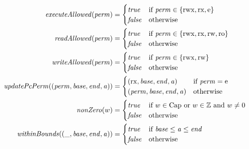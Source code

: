 \documentclass{article}
\newcommand{\false}{\mathit{false}}
\newcommand{\true}{\mathit{true}}
\newcommand{\var}[1]{\mathit{#1}}
\newcommand{\addr}{\var{a}}
\newcommand{\start}{\var{base}}
\newcommand{\addrend}{\var{end}}
\newcommand{\perm}{\var{perm}}
\newcommand{\plainfun}[2]{
  \ifthenelse{\equal{#2}{}}
             {\mathit{#1}}
             {\mathit{#1}(#2)}
}
\newcommand{\updatePcPerm}[1]{\plainfun{updatePcPerm}{#1}}
\newcommand{\executeAllowed}[1]{\plainfun{executeAllowed}{#1}}
\newcommand{\nonZero}[1]{\plainfun{nonZero}{#1}}
\newcommand{\readAllowed}[1]{\plainfun{readAllowed}{#1}}
\newcommand{\writeAllowed}[1]{\plainfun{writeAllowed}{#1}}
\newcommand{\withinBounds}[1]{\plainfun{withinBounds}{#1}}
\newcommand{\plaindom}[1]{\mathrm{#1}}
\newcommand{\Caps}{\plaindom{Cap}}
\newcommand{\ints}{\mathbb{Z}}
\newcommand{\plainperm}[1]{\mathrm{#1}}
\newcommand{\readonly}{\plainperm{ro}}
\newcommand{\readwrite}{\plainperm{rw}}
\newcommand{\exec}{\plainperm{rx}}
\newcommand{\entry}{\plainperm{e}}
\newcommand{\rwx}{\plainperm{rwx}}
\begin{document}
\begin{align*}
  \executeAllowed{\perm} &=
                           \begin{cases}
                             \true & \text{if } \perm \in \{ \rwx, \exec, \entry \} \\
                             \false & \text{otherwise}
                           \end{cases} \\
  \readAllowed{\perm} &=
                           \begin{cases}
                             \true & \text{if } \perm \in \{ \rwx, \exec, \readwrite, \readonly \} \\
                             \false & \text{otherwise}
                           \end{cases} \\
  \writeAllowed{\perm} &=
                           \begin{cases}
                             \true & \text{if } \perm \in \{ \rwx, \readwrite\} \\
                             \false & \text{otherwise}
                           \end{cases} \\
  \updatePcPerm{(\perm,\start,\addrend,\addr)} &=
                                     \begin{cases}
                                       (\exec,\start,\addrend,\addr) & \text{if $\perm = \entry$}\\
                                       (\perm,\start,\addrend,\addr) & \text{otherwise} 
                                     \end{cases} \\
  \nonZero{w} &=
                \begin{cases}
                  \true & \text{if $w\in \Caps$ or $w\in \ints$ and $w \neq 0$}\\
                  \false & \text{otherwise}
                \end{cases} \\
  \withinBounds{(\_,\start,\addrend,\addr)} &=
                                              \begin{cases}
                                                \true  & \text{if $\start \leq \addr \leq \addrend$} \\
                                                \false & \text{otherwise}
                                              \end{cases} \\

\end{align*}
\end{document}
